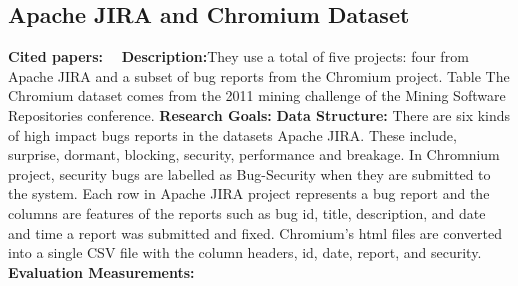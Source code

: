 \subsection{Apache JIRA and Chromium Dataset}
\textbf{Cited papers:}~\cite{peters2018text}~\cite{ohira2015dataset} \newline
\textbf{Description:}They use a total of five projects: four from Apache JIRA and a subset of bug reports from the Chromium project. Table The Chromium dataset comes from the 2011 mining challenge of the Mining Software Repositories conference. \newline
\textbf{Research Goals:}  \newline
\textbf{Data Structure:} There are six kinds of high impact bugs reports in
the datasets Apache JIRA. These include, surprise, dormant, blocking, security, performance and breakage. In Chromnium project, security bugs are labelled as Bug-Security when they are submitted to the system. Each row in Apache JIRA project represents a bug report and the columns are features of the reports such as bug id, title, description, and date and time a report was submitted and fixed. Chromium's html files are converted into a single CSV file with the
column headers, id, date, report, and security.\newline
\textbf{Evaluation Measurements:} \newline




